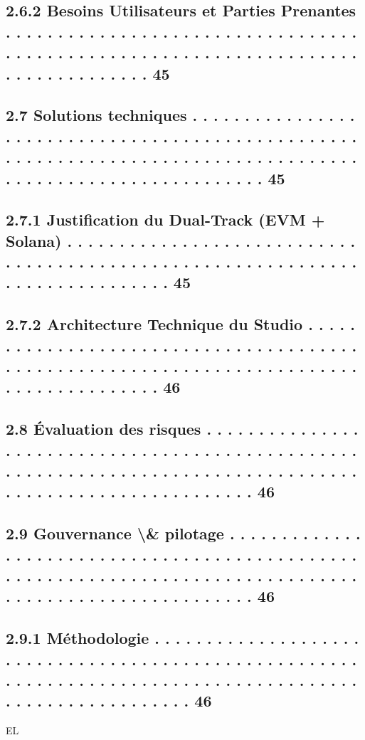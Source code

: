\documentclass[12pt,landscape,a4paper]{article}
\begin{document}
\subsection{2.6.2               Besoins Utilisateurs et Parties Prenantes . . . . . . . . . . . . . . . . . . . . . . . . . . . . . . . . . . . . . . . . . . . . . . . . . . . . . . . . . . . . . . . . . . . . . . . . . . . . . . . . . . 45}
\subsection{2.7     Solutions techniques . . . . . . . . . . . . . . . . . . . . . . . . . . . . . . . . . . . . . . . . . . . . . . . . . . . . . . . . . . . . . . . . . . . . . . . . . . . . . . . . . . . . . . . . . . . . . . . . . . . . . . . . . . . . . 45}
\subsection{2.7.1               Justification du Dual-Track (EVM + Solana) . . . . . . . . . . . . . . . . . . . . . . . . . . . . . . . . . . . . . . . . . . . . . . . . . . . . . . . . . . . . . . . . . . . . . . . . . . . . . . 45}
\subsection{2.7.2               Architecture Technique du Studio . . . . . . . . . . . . . . . . . . . . . . . . . . . . . . . . . . . . . . . . . . . . . . . . . . . . . . . . . . . . . . . . . . . . . . . . . . . . . . . . . . . . . . . . 46}
\subsection{2.8     Évaluation des risques . . . . . . . . . . . . . . . . . . . . . . . . . . . . . . . . . . . . . . . . . . . . . . . . . . . . . . . . . . . . . . . . . . . . . . . . . . . . . . . . . . . . . . . . . . . . . . . . . . . . . . . . . . . 46}
\subsection{2.9     Gouvernance \textbackslash{}& pilotage . . . . . . . . . . . . . . . . . . . . . . . . . . . . . . . . . . . . . . . . . . . . . . . . . . . . . . . . . . . . . . . . . . . . . . . . . . . . . . . . . . . . . . . . . . . . . . . . . . . . . . . . . 46}
\subsection{2.9.1               Méthodologie . . . . . . . . . . . . . . . . . . . . . . . . . . . . . . . . . . . . . . . . . . . . . . . . . . . . . . . . . . . . . . . . . . . . . . . . . . . . . . . . . . . . . . . . . . . . . . . . . . . . . . . . . . 46}
\vspace{0.5em}
\vspace{0.5em}
\vspace{0.5em}
\vspace{0.5em}
EL\\
\end{document}
